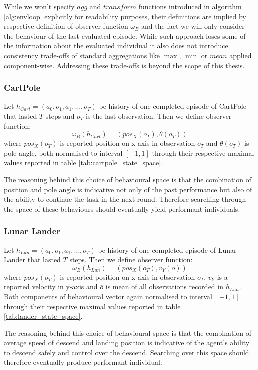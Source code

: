 While we won't specify $ agg $ and $ transform$ functions introduced in algorithm \ref{alg:envloop} explicitly for readability purposes, their definitions are implied by respective definition of observer function $ \omega_B $ and the fact we will only consider the behaviour of the last evaluated episode. While such approach loses some of the information about the evaluated individual it also does not introduce consistency trade-offs of standard aggregations like $ \max $, $ \min $ or $ mean $ applied component-wise. Addressing these trade-offs is beyond the scope of this thesis. 
\subsubsection{CartPole}
Let $ h_{Cart} = (a_0,o_1,a_1, \dots, o_T) $ be history of one completed episode of CartPole that lasted $ T $ steps and $ o_T $ is the last observation. Then we define observer function: $$ \omega_B(h_{Cart}) = (pos_X(o_T), \theta(o_T))$$ where $ pos_X(o_T) $ is reported position on  x-axis in observation $o_T$ and $ \theta(o_T) $ is pole angle, both normalised to interval $ \left[-1, 1\right] $ through their respective maximal values reported in table \ref{tab:cartpole_state_space}.

The reasoning behind this choice of behavioural space is that the combination of position and pole angle is indicative not only of the past performance but also of the ability to continue the task in the next round. Therefore searching through the space of these behaviours should eventually yield performant individuals.
\subsubsection{Lunar Lander}
Let $ h_{Lun} = (a_0,o_1,a_1, \dots, o_T) $ be history of one completed episode of Lunar Lander that lasted $ T $ steps. Then we define observer function: $$ \omega_B(h_{Lun}) = (pos_X(o_T), v_Y(\bar{o}))$$ where $ pos_X(o_T) $ is reported position on  x-axis in observation $o_T$, $ v_Y $ is a reported velocity in y-axis and $ \bar{o} 
 $ is mean of all observations recorded in $ h_{Lun} $.  Both components of behavioural vector again normalised to interval $ \left[-1, 1\right] $ through their respective maximal values reported in table \ref{tab:lander_state_space}.
 
 The reasoning behind this choice of behavioural space is that the combination of average speed of descend and landing position is indicative of the agent's ability to descend safely and control over the descend. Searching over this space should therefore eventually produce performant individual.
